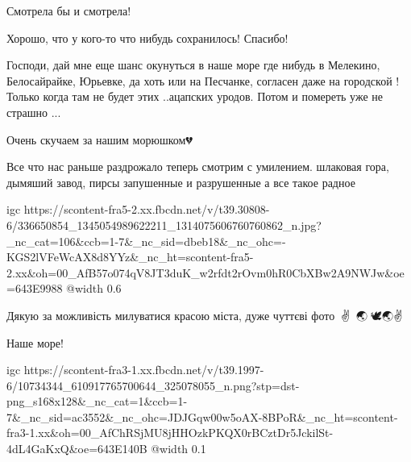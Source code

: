  
 
 
 
 

\qqSecCmt


Смотрела бы и смотрела!


Хорошо, что у кого-то что нибудь сохранилось! Спасибо!


Господи, дай мне еще шанс окунуться в наше море где нибудь в Мелекино,
Белосайрайке, Юрьевке, да хоть или на Песчанке, согласен даже на городской !
Только когда там не будет этих ..ацапских уродов. Потом и помереть уже не
страшно ...


Очень скучаем за нашим морюшком💔


Все что нас раньше раздрожало теперь смотрим с умилением. шлаковая гора,
дымяший завод, пирсы запушенные и разрушенные а все такое радное


\ifcmt
  igc https://scontent-fra5-2.xx.fbcdn.net/v/t39.30808-6/336650854_1345054989622211_1314075606760760862_n.jpg?_nc_cat=106&ccb=1-7&_nc_sid=dbeb18&_nc_ohc=-KGS2lVFeWcAX8d8YYz&_nc_ht=scontent-fra5-2.xx&oh=00_AfB57o074qV8JT3duK_w2rfdt2rOvm0hR0CbXBw2A9NWJw&oe=643E9988
  @width 0.6
\fi


Дякую за можливість милуватися красою міста, дуже чуттєві фото💙💛✌🇺🇦🌏🙏🕊🌏✌


Наше море!


\ifcmt
  igc https://scontent-fra3-1.xx.fbcdn.net/v/t39.1997-6/10734344_610917765700644_325078055_n.png?stp=dst-png_s168x128&_nc_cat=1&ccb=1-7&_nc_sid=ac3552&_nc_ohc=JDJGqw00w5oAX-8BPoR&_nc_ht=scontent-fra3-1.xx&oh=00_AfChRSjMU8jHHOzkPKQX0rBCztDr5JckilSt-4dL4GaKxQ&oe=643E140B
  @width 0.1
\fi

